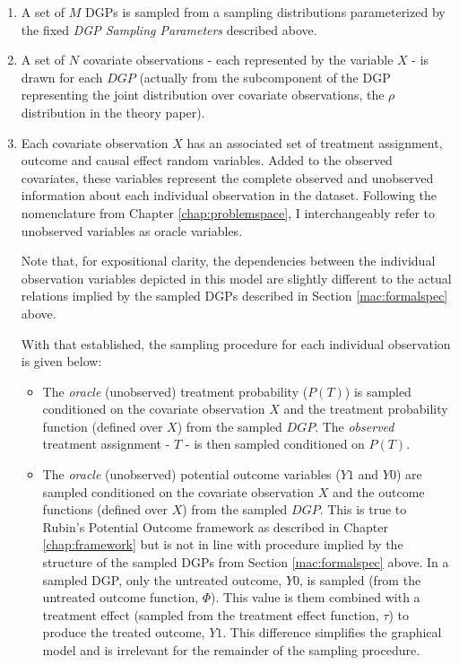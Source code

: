 \documentclass[../main.tex]{subfiles}
\begin{document}
\begin{enumerate}

\item A set of $M$ DGPs is sampled from a sampling distributions parameterized by the fixed \textit{DGP Sampling Parameters} described above.

\item A set of $N$ covariate observations - each represented by the variable $X$ - is drawn for each $DGP$ (actually from the subcomponent of the DGP representing the joint distribution over covariate observations, the $\rho$ distribution in the theory paper).

\item Each covariate observation $X$ has an associated set of treatment assignment, outcome and causal effect random variables. Added to the observed covariates, these variables represent the complete observed and unobserved information about each individual observation in the dataset. Following the nomenclature from Chapter \ref{chap:problemspace}, I interchangeably refer to unobserved variables as oracle variables.

\vspace{\baselineskip}

Note that, for expositional clarity, the dependencies between the individual observation variables depicted in this model are slightly different to the actual relations implied by the sampled DGPs described in Section \ref{mac:formalspec} above.

\vspace{\baselineskip}

With that established, the sampling procedure for each individual observation is given below:

\begin{itemize}
    \item The \textit{oracle} (unobserved) treatment probability ($P(T)$) is sampled conditioned on the covariate observation $X$ and the treatment probability function (defined over $X$) from the sampled $DGP$. The \textit{observed} treatment assignment - $T$ - is then sampled conditioned on $P(T)$.

    \item The \textit{oracle} (unobserved) potential outcome variables ($Y1$ and $Y0$) are sampled conditioned on the covariate observation $X$ and the outcome functions (defined over $X$) from the sampled $DGP$. This is true to Rubin's Potential Outcome framework as described in Chapter \ref{chap:framework} but is not in line with procedure implied by the structure of the sampled DGPs from Section \ref{mac:formalspec} above. In a sampled DGP, only the untreated outcome, $Y0$, is sampled (from the untreated outcome function, $\Phi$). This value is them combined with a treatment effect (sampled from the treatment effect function, $\tau$) to produce the treated outcome, $Y1$. This difference simplifies the graphical model and is irrelevant for the remainder of the sampling procedure.


\end{itemize}
\end{enumerate}
\end{document}
